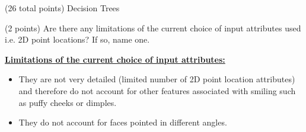 \documentclass[12pt]{article}
\begin{document}
\begin{question}{(26 total points) Decision Trees}
\begin{subquestion}



\end{subquestion}



%
%
\begin{subquestion}{(2 points) 
Are there any limitations of the current choice of input attributes used i.e. 2D point locations? If so, name one. 
}


\begin{answerbox}{10em}
\large{\textbf{\underline{Limitations of the current choice of input attributes:}}}
\normalsize{
\begin{itemize}
    \item They are not very detailed (limited number of 2D point location attributes) and therefore do not account for other features associated with smiling such as puffy cheeks or dimples.
    \item They do not account for faces pointed in different angles.
\end{itemize}
}
\end{answerbox}



\end{subquestion}


\end{question}




\clearpage
\end{document}
